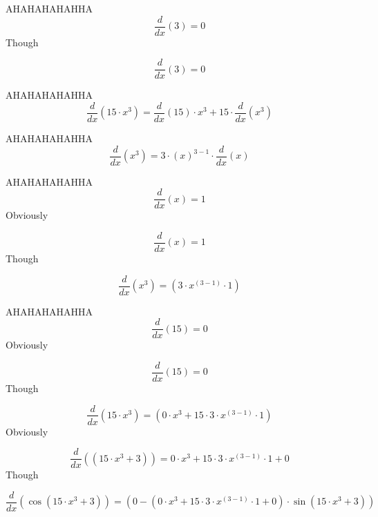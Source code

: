 \documentclass[12pt,a4paper]{extreport}
\begin{document}
AHAHAHAHAHHA
\begin{dmath*}
    \frac{d}{dx}\left(3\right) =  0 
\end{dmath*}
Though


\begin{dmath*}
    \frac{d}{dx} \left(3\right) = 0
\end{dmath*}

AHAHAHAHAHHA
\begin{dmath*}
    \frac{d}{dx}\left(15\cdot x^{3}\right) = \frac{d}{dx}\left(15\right) \cdot x^{3} + 15 \cdot \frac{d}{dx}\left(x^{3}\right)
\end{dmath*}

AHAHAHAHAHHA
\begin{dmath*}
    \frac{d}{dx}\left(x^{3}\right) = 3 \cdot \left(x\right)^{3 -  1 } \cdot \frac{d}{dx}\left(x\right)
\end{dmath*}

AHAHAHAHAHHA
\begin{dmath*}
    \frac{d}{dx}\left(x\right) =  1 
\end{dmath*}
Obviously


\begin{dmath*}
    \frac{d}{dx} \left(x\right) = 1
\end{dmath*}
Though


\begin{dmath*}
    \frac{d}{dx} \left(x^{3}\right) = \left(3\cdot x^{\left(3-1\right)}\cdot 1\right)
\end{dmath*}

AHAHAHAHAHHA
\begin{dmath*}
    \frac{d}{dx}\left(15\right) =  0 
\end{dmath*}
Obviously


\begin{dmath*}
    \frac{d}{dx} \left(15\right) = 0
\end{dmath*}
Though


\begin{dmath*}
    \frac{d}{dx} \left(15\cdot x^{3}\right) = \left(0\cdot x^{3}+15\cdot 3\cdot x^{\left(3-1\right)}\cdot 1\right)
\end{dmath*}
Obviously


\begin{dmath*}
    \frac{d}{dx} \left(\left(15\cdot x^{3}+3\right)\right) = 0\cdot x^{3}+15\cdot 3\cdot x^{\left(3-1\right)}\cdot 1+0
\end{dmath*}
Though


\begin{dmath*}
    \frac{d}{dx} \left(\cos \left(15\cdot x^{3}+3\right)\right) = \left(0-\left(0\cdot x^{3}+15\cdot 3\cdot x^{\left(3-1\right)}\cdot 1+0\right)\cdot \sin \left(15\cdot x^{3}+3\right)\right)
\end{dmath*}
\end{document}
